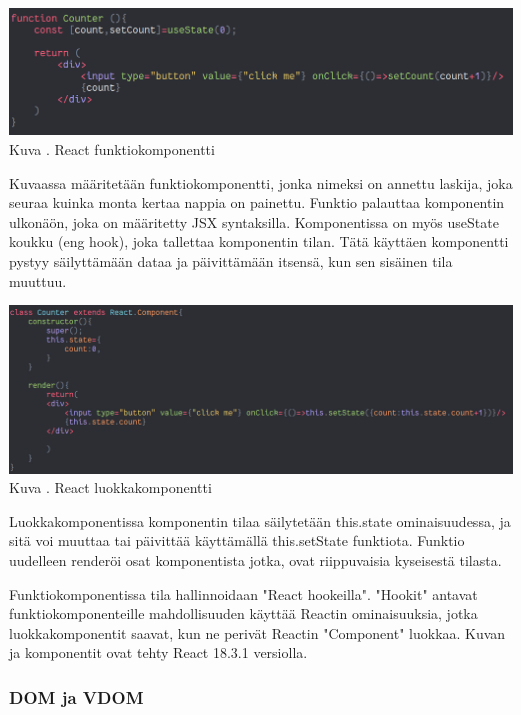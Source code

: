\bigskip
\includegraphics[width=15cm]{src/public/oppar/function_component.png}\\
Kuva \getImgCount{}. React funktiokomponentti
\medskip

Kuvaassa \theimgCounter{} määritetään funktiokomponentti, jonka nimeksi on annettu laskija, joka seuraa kuinka monta kertaa nappia on painettu.
Funktio palauttaa komponentin ulkonäön, joka on määritetty JSX syntaksilla.
Komponentissa on myös useState koukku (eng hook), joka tallettaa komponentin tilan.
Tätä käyttäen komponentti pystyy säilyttämään dataa ja päivittämään itsensä, kun sen sisäinen tila muuttuu.
\medskip




\bigskip
\includegraphics[width=15cm]{src/public/oppar/class_.png}\\
Kuva \getImgCount{}. React luokkakomponentti
\medskip



Luokkakomponentissa komponentin tilaa säilytetään this.state ominaisuudessa, ja sitä voi muuttaa tai päivittää käyttämällä this.setState funktiota. 
Funktio uudelleen renderöi osat komponentista jotka, ovat riippuvaisia kyseisestä tilasta.
\medskip


Funktiokomponentissa tila hallinnoidaan "React hookeilla"{}. 
"Hookit"{} antavat funktiokomponenteille mahdollisuuden käyttää Reactin ominaisuuksia, 
jotka luokkakomponentit saavat, kun ne perivät Reactin "Component"{} luokkaa.
Kuvan \prevImageCount{} ja \theimgCounter{} komponentit ovat tehty React 18.3.1 versiolla.
\medskip



\subsubsection{DOM ja VDOM}



